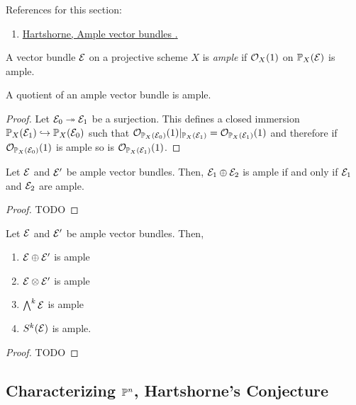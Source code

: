 \documentclass[12pt]{article}
\begin{document}
\begin{rmk}
References for this section:
\begin{enumerate}
\item \href{http://www.numdam.org/article/PMIHES_1966__29__63_0.pdf}{Hartshorne, Ample vector bundles \cite{ample_vb}.}
\end{enumerate}
\end{rmk}

\begin{defn}
A vector bundle $\E$ on a projective scheme $X$ is \textit{ample} if $\struct{X}(1)$ on $\P_X(\E)$ is ample. 
\end{defn}

\begin{prop}
A quotient of an ample vector bundle is ample.
\end{prop}

\begin{proof}
Let $\E_0 \onto \E_1$ be a surjection. This defines a closed immersion $\P_X(\E_1) \embed \P_X(\E_0)$ such that $\struct{\P_X(\E_0)}(1) |_{\P_X(\E_1)} = \struct{\P_X(\E_1)}(1)$ and therefore if $\struct{\P_X(\E_0)}(1)$ is ample so is $\struct{\P_X(\E_1)}(1)$.
\end{proof}

\begin{prop}
Let $\E$ and $\E'$ be ample vector bundles. Then, $\E_1 \oplus \E_2$ is ample if and only if $\E_1$ and $\E_2$ are ample.
\end{prop}

\begin{proof}
TODO
\end{proof}

\begin{prop}
Let $\E$ and $\E'$ be ample vector bundles. Then,
\begin{enumerate}
\item $\E \oplus \E'$ is ample
\item $\E \ot \E'$ is ample
\item $\bigwedge^k \E$ is ample
\item $S^k(\E)$ is ample.
\end{enumerate}
\end{prop}

\begin{proof}
TODO
\end{proof}

\subsection{Characterizing $\P^n$, Hartshorne's Conjecture}
\end{document}
